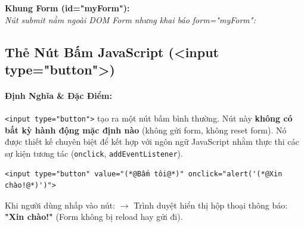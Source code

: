 \documentclass[11pt,oneside]{book}
\newcommand{\codeinline}[1]{\textcolor{accentOrange}{\texttt{#1}}}
\begin{document}
\begin{browserWindow}[Mô Phỏng Trình Duyệt: Nút Submit Nằm Bên Ngoài Form Kết Nối Qua form="id"]
\sffamily\small
\textbf{Khung Form (id="myForm"):}  \\[6pt]
\textcolor{codeComment}{\small\textit{Nút submit nằm ngoài DOM Form nhưng khai báo form="myForm":}} \quad
{}
\end{browserWindow}

\subsection{Thẻ Nút Bấm JavaScript (<input type="button">)}
\label{subsec:input_button}

\paragraph{Định Nghĩa \& Đặc Điểm:}
\codeinline{<input type="button">} tạo ra một nút bấm bình thường. Nút này \textbf{không có bất kỳ hành động mặc định nào} (không gửi form, không reset form). Nó được thiết kế chuyên biệt để kết hợp với ngôn ngữ JavaScript nhằm thực thi các sự kiện tương tác (\codeinline{onclick}, \codeinline{addEventListener}).

\begin{codeWindow}[Cú pháp nút input type="button" kích hoạt sự kiện onclick]
\begin{lstlisting}[language=HTML5]
<input type="button" value="(*@Bấm tôi@*)" onclick="alert('(*@Xin chào!@*)')">
\end{lstlisting}
\end{codeWindow}

\begin{browserWindow}
\sffamily\small
Khi người dùng nhấp vào nút:
 $\rightarrow$ Trình duyệt hiển thị hộp thoại thông báo: \textcolor{accentOrange}{\textbf{"Xin chào!"}} (Form không bị reload hay gửi đi).
\end{browserWindow}
\end{document}
